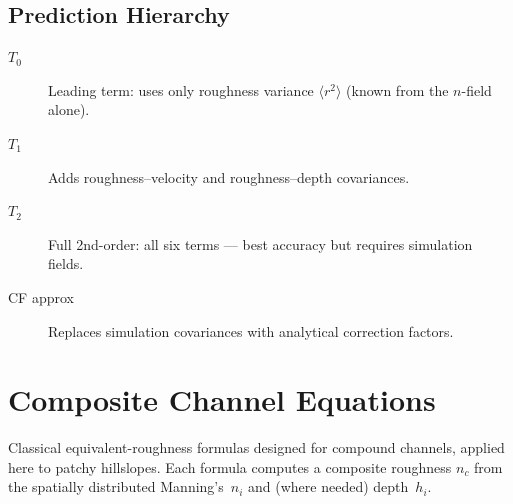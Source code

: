 \documentclass[11pt]{article}
\newcommand{\avg}[1]{\langle #1 \rangle}
\newcommand{\nc}{n_c}
\begin{document}
\subsection{Prediction Hierarchy}

\begin{description}
  \item[$T_0$] Leading term: uses only roughness variance $\avg{r^2}$ (known from the $n$-field alone).
  \item[$T_1$] Adds roughness--velocity and roughness--depth covariances.
  \item[$T_2$] Full 2nd-order: all six terms --- best accuracy but requires simulation fields.
  \item[CF approx] Replaces simulation covariances with analytical correction factors.
\end{description}


\section{Composite Channel Equations}

Classical equivalent-roughness formulas designed for compound channels, applied here to patchy hillslopes.
Each formula computes a composite roughness $\nc$ from the spatially distributed Manning's~$n_i$ and (where needed) depth~$h_i$.
\end{document}
